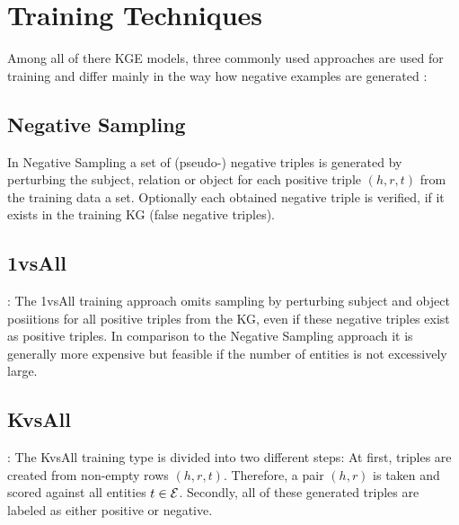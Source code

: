 \section{Training Techniques}
\label{sec:training_techniques}

Among all of there \ac{KGE} models, three commonly used approaches are used for training and differ mainly in the way how negative examples are generated \cite{Ruffinelli2020You}:

\subsection{Negative Sampling}
In Negative Sampling a set of (pseudo-) negative triples is generated by perturbing the subject, relation or object for each positive triple $(h, r, t)$ from the training data a set.
Optionally each obtained negative triple is verified, if it exists in the training \ac{KG} (false negative triples).






\subsection{1vsAll}:
The 1vsAll training approach omits sampling by perturbing subject and object posiitions for all positive triples from the \ac{KG}, even if these negative triples exist as positive triples.
In comparison to the Negative Sampling approach it is generally more expensive but feasible if the number of entities is not excessively large.
    
\subsection{KvsAll}:
The KvsAll training type is divided into two different steps:
At first, triples are created from non-empty rows $(h,r,t)$.
Therefore, a pair $(h,r)$ is taken and scored against all entities $t \in \mathcal{E}$.
Secondly, all of these generated triples are labeled as either positive or negative.